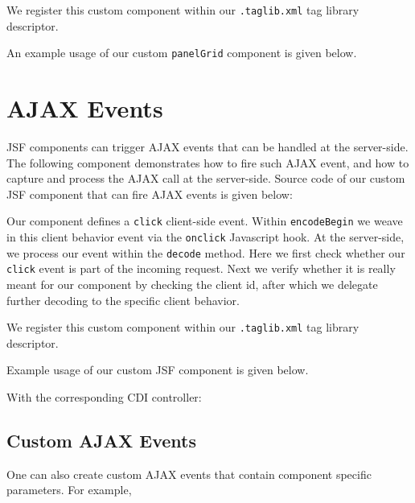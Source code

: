 We register this custom component within our \texttt{.taglib.xml} tag library descriptor.


An example usage of our custom \texttt{panelGrid} component is given below.



\section{AJAX Events}
JSF components can trigger AJAX events that can be handled at the server-side.
The following component demonstrates how to fire such AJAX event, and how to capture and process the AJAX call at the server-side.
Source code of our custom JSF component that can fire AJAX events is given below:

Our component defines a \texttt{click} client-side event.
Within \texttt{encodeBegin} we weave in this client behavior event via the \texttt{onclick} Javascript hook.
At the server-side, we process our event within the \texttt{decode} method.
Here we first check whether our \texttt{click} event is part of the incoming request.
Next we verify whether it is really meant for our component by checking the client id, after which we delegate further decoding to the specific client behavior.

We register this custom component within our \texttt{.taglib.xml} tag library descriptor.


Example usage of our custom JSF component is given below.


With the corresponding CDI controller:


\subsection{Custom AJAX Events}

One can also create custom AJAX events that contain component specific parameters.
For example,


